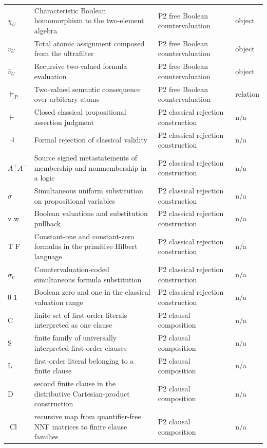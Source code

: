 \begin{longtable}{@{}p{}p{}p{}p{}@{}}
\(\chi_U\) & Characteristic Boolean homomorphism to the two-element algebra & P2 free Boolean countervaluation & object \\
\(v_U\) & Total atomic assignment composed from the ultrafilter & P2 free Boolean countervaluation & object \\
\(\widehat v_U\) & Recursive two-valued formula evaluation & P2 free Boolean countervaluation & object \\
\(\models_P\) & Two-valued semantic consequence over arbitrary atoms & P2 free Boolean countervaluation & relation \\
\ensuremath{\vdash} & Closed classical propositional assertion judgment & P2 classical rejection construction & n/a \\
\ensuremath{\dashv} & Formal rejection of classical validity & P2 classical rejection construction & n/a \\
\ensuremath{A^{+} A^{-}} & Source signed metastatements of membership and nonmembership in a logic & P2 classical rejection construction & n/a \\
\ensuremath{\sigma} & Simultaneous uniform substitution on propositional variables & P2 classical rejection construction & n/a \\
v w & Boolean valuations and substitution pullback & P2 classical rejection construction & n/a \\
T F & Constant-one and constant-zero formulas in the primitive Hilbert language & P2 classical rejection construction & n/a \\
\ensuremath{\sigma_v} & Countervaluation-coded simultaneous formula substitution & P2 classical rejection construction & n/a \\
0 1 & Boolean zero and one in the classical valuation range & P2 classical rejection construction & n/a \\
C & finite set of first-order literals interpreted as one clause & P2 clausal composition & n/a \\
S & finite family of universally interpreted first-order clauses & P2 clausal composition & n/a \\
L & first-order literal belonging to a finite clause & P2 clausal composition & n/a \\
D & second finite clause in the distributive Cartesian-product construction & P2 clausal composition & n/a \\
\ensuremath{\operatorname{Cl}} & recursive map from quantifier-free NNF matrices to finite clause families & P2 clausal composition & n/a \\

\end{longtable}
